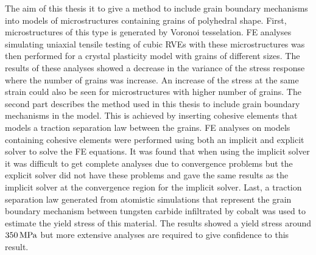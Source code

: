 \documentclass[abstract.tex]{subfiles}
\begin{document}
The aim of this thesis it to give a method  to include grain boundary mechanisms into models of microstructures containing grains of polyhedral shape.
First, microstructures of this type is generated by Voronoi tesselation. FE analyses simulating uniaxial tensile testing of cubic RVEs with these microstructures was then performed for a crystal plasticity model with grains of different sizes. The results of these analyses showed a decrease in the variance of the stress response where the number of grains was increase. An increase of the stress at the same strain could also be seen for microstructures with higher number of grains.  The second part describes the method used in this thesis to include grain boundary mechanisms in the model. This is achieved by inserting cohesive elements that models a traction separation law between the grains. FE analyses on models containing cohesive elements were performed using both an implicit and explicit solver to solve the FE equations. It was found that when using the implicit solver it was difficult to get complete analyses due to convergence problems but the explicit solver did not have these problems and gave the same results as the implicit solver at the convergence region for the implicit solver. Last, a traction separation law generated from atomistic simulations that represent the grain boundary mechanism between tungsten carbide infiltrated by cobalt was used to estimate the yield stress of this material. The results showed a yield stress around $\unit[350]{MPa}$ but more extensive analyses are required to give confidence to this result.
\end{document}
